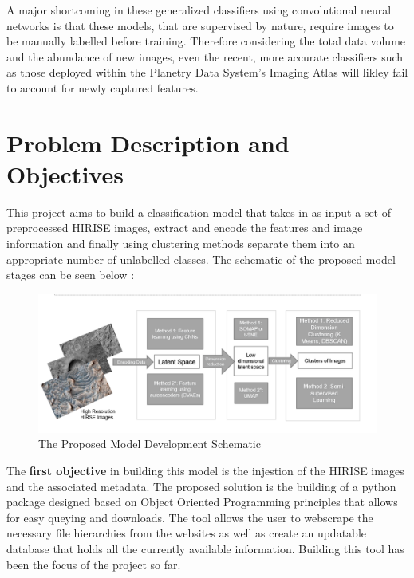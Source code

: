\documentclass[project-plan]{report-template}
\begin{document}
A major shortcoming in these generalized classifiers using convolutional neural networks is that these models, that are supervised by nature, require images to be manually labelled before training. Therefore considering the total data volume and the abundance of new images, even the recent, more accurate classifiers such as those deployed within the Planetry Data System's Imaging Atlas \citep{Wagstaff2018DeepMC}  will likley fail to account for newly captured features. \\



\section{Problem Description and Objectives}
This project aims to build a classification model that takes in as input a set of preprocessed HIRISE images, extract and encode the features and image information and finally using clustering methods separate them into an appropriate number of unlabelled classes. The schematic of the proposed model stages can be seen below :\\

\begin{figure}[htp]
    \begin{center}
        \includegraphics[width=1.1\textwidth]{model-schematic.png}
        \caption{\label{fig:Model Schematic} The Proposed Model Development Schematic }
    \end{center}
\end{figure}


The \textbf{first objective } in building this model is the injestion of the HIRISE images and the associated metadata. The proposed solution is the building of a python package designed based on Object Oriented Programming principles that allows for easy queying and downloads. The tool allows the user to webscrape the necessary file hierarchies from the websites as well as create an updatable database that holds all the currently available information. Building this tool has been the focus of the project so far. \\
\end{document}
